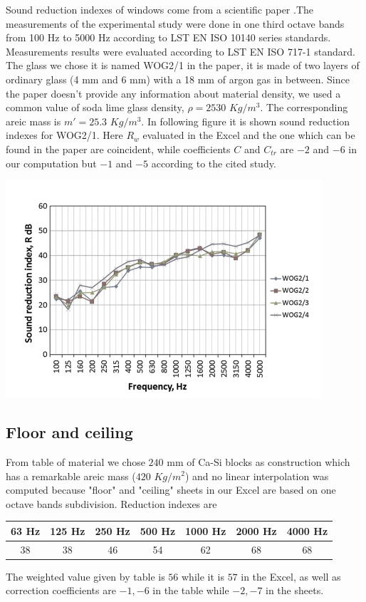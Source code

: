 \documentclass[]{scrartcl}
\begin{document}
Sound reduction indexes of windows come from a scientific paper \cite{Window}.The measurements of the experimental study were done in one third octave bands from 100 Hz to 5000 Hz according to LST EN ISO 10140 series standards. Measurements results were evaluated according to LST EN ISO 717-1 standard. The glass we chose it is named WOG2/1 in the paper, it is made of two layers of ordinary glass (4 mm and 6 mm) with a 18 mm of argon gas in between. Since the paper doesn't provide any information about material density, we used a common value of soda lime glass density, $ \rho = 2530$ $Kg/m^3$. The corresponding areic mass is $m' = 25.3$ $Kg/m^3$.
In following figure it is shown sound reduction indexes for WOG2/1.  Here $R_w$ evaluated in the Excel and the one which can be found in the paper are coincident, while coefficients $C$ and $C_{tr}$ are $-2$ and $-6$ in our computation but $-1$ and $-5$ according to the cited study. 

\includegraphics[width=0.7\linewidth]{windows_sound_reduction}

\subsection{Floor and ceiling}
From table of material we chose $240$ mm of Ca-Si blocks as construction which has a remarkable areic mass ($420$ $Kg/m^2$) and no linear interpolation was computed because "floor" and "ceiling" sheets in our Excel are based on one octave bands subdivision. Reduction indexes are \begin{tabular}{|c|c|c|c|c|c|c|}
	\hline
	63 Hz & 125 Hz & 250 Hz & 500 Hz & 1000 Hz & 2000 Hz & 4000 Hz \\
	\hline
	38 & 38 & 46 & 54 & 62 & 68 & 68 \\
	\hline
\end{tabular}

The weighted value given by table is $56$ while it is $57$ in the Excel, as well as correction coefficients are $-1,-6$ in the table while $-2,-7$ in the sheets. 
\end{document}
